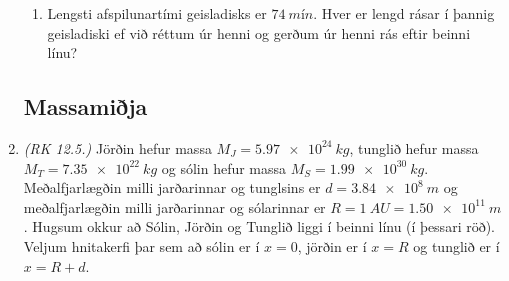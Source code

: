 \begin{enumerate}[label = \textbf{Dæmi \thechapter.\arabic*.}]
\begin{enumerate}[label = \textbf{(\alph*)}]
    \item Lengsti afspilunartími geisladisks er $\SI{74}{mín}$. Hver er lengd rásar í þannig geisladiski ef við réttum úr henni og gerðum úr henni rás eftir beinni línu?
\end{enumerate}

\subsection*{Massamiðja}



\item \textit{(RK 12.5.)} Jörðin hefur massa $M_J = \SI{5.97e24}{kg}$, tunglið hefur massa $M_T = \SI{7.35e22}{kg}$ og sólin hefur massa $M_S = \SI{1.99e30}{kg}$. Meðalfjarlægðin milli jarðarinnar og tunglsins er $d = \SI{3.84e8}{m}$ og meðalfjarlægðin milli jarðarinnar og sólarinnar er $R = \SI{1}{AU} = \SI{1.50e11}{m}$. Hugsum okkur að Sólin, Jörðin og Tunglið liggi í beinni línu (í þessari röð). Veljum hnitakerfi þar sem að sólin er í $x = 0$, jörðin er í $x = R$ og tunglið er í $x = R+d$.


\end{enumerate}
